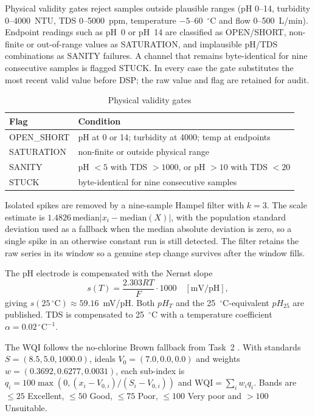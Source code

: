 \documentclass[conference]{IEEEtran}
\begin{document}
Physical validity gates reject samples outside plausible ranges (pH 0--14,
turbidity 0--4000~NTU, TDS 0--5000~ppm, temperature $-5$--60~$^\circ$C and
flow 0--500~L/min). Endpoint readings such as pH~0 or pH~14 are classified as
OPEN/SHORT, non-finite or out-of-range values as SATURATION, and implausible
pH/TDS combinations as SANITY failures. A channel that remains byte-identical
for nine consecutive samples is flagged STUCK. In every case the gate
substitutes the most recent valid value before DSP; the raw value and flag are
retained for audit.

\begin{table}[t]
\caption{Physical validity gates}
\label{tab:validity}
\centering
\scriptsize
\begin{tabular}{@{}ll@{}}
\toprule
Flag & Condition \\
\midrule
OPEN\_SHORT & pH at 0 or 14; turbidity at 4000; temp at endpoints \\
SATURATION & non-finite or outside physical range \\
SANITY & pH $<5$ with TDS $>1000$, or pH $>10$ with TDS $<20$ \\
STUCK & byte-identical for nine consecutive samples \\
\bottomrule
\end{tabular}
\end{table}

Isolated spikes are removed by a nine-sample Hampel filter with $k=3$. The
scale estimate is $1.4826\,\mathrm{median}|x_i-\mathrm{median}(X)|$, with the
population standard deviation used as a fallback when the median absolute
deviation is zero, so a single spike in an otherwise constant run is still
detected. The filter retains the raw series in its window so a genuine step
change survives after the window fills.

The pH electrode is compensated with the Nernst slope
\begin{equation}
s(T)=\frac{2.303RT}{F}\cdot 1000 \quad [\mathrm{mV/pH}],
\end{equation}
giving $s(25\,^\circ\mathrm{C})\approx59.16$~mV/pH. Both $pH_T$ and the
25~$^\circ$C-equivalent $pH_{25}$ are published. TDS is compensated to 25~$^\circ$C
with a temperature coefficient $\alpha=0.02\,^\circ\mathrm{C}^{-1}$.

The WQI follows the no-chlorine Brown fallback from Task~2 \cite{Task2}. With
standards $S=(8.5,5.0,1000.0)$, ideals $V_0=(7.0,0.0,0.0)$ and weights
$w=(0.3692,0.6277,0.0031)$, each sub-index is
$q_i=100\max(0,(x_i-V_{0,i})/(S_i-V_{0,i}))$ and
$\mathrm{WQI}=\sum_i w_i q_i$. Bands are $\le25$ Excellent, $\le50$ Good,
$\le75$ Poor, $\le100$ Very poor and $>100$ Unsuitable.
\end{document}
